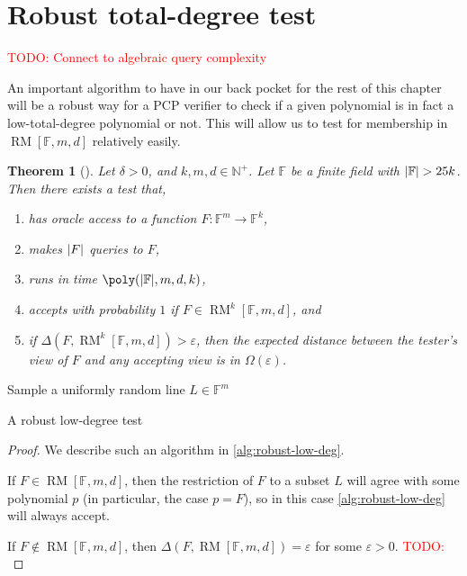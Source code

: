 \documentclass[english,12pt]{reedthesis}
\theoremstyle{plain}
\newtheorem{thm}{Theorem}[section]
\theoremstyle{definition}
\theoremstyle{remark}
\DeclareMathOperator{\RM}{RM}
\DeclarePairedDelimiter{\abs}{\lvert}{\rvert}
\newcommand{\TODO}[1]{\textcolor{red}{TODO: #1}}
\begin{document}
\section{Robust total-degree test}\label{sec:robust-degree}

\TODO{Connect to algebraic query complexity}

An important algorithm to have in our back pocket for the rest of this chapter
will be a robust way for a PCP verifier to check if a given polynomial is in
fact a low-total-degree polynomial or not. This will allow us to test for
membership in $\RM[\mathbb{F}, m, d]$ relatively easily.

\begin{thm}[{\cite[Prop.\ 5.7]{Par21}}]\label{thm:robust-low-deg}
  Let $\delta > 0$, and $k, m, d \in \mathbb{N}^{+}$. Let $\mathbb{F}$ be a finite field with
  $\abs{\mathbb{F}} > 25k$. Then there exists a test that,
  \begin{enumerate}
    \item has oracle access to a function $F\colon \mathbb{F}^{m} \rightarrow \mathbb{F}^{k}$,
    \item makes $\abs{F}$ queries to $F$,
    \item runs in time $\poly(\abs{\mathbb{F}}, m, d, k)$,
    \item accepts with probability $1$ if $F \in \RM^{k}[\mathbb{F}, m, d]$, and
    \item if $\Delta(F, \RM^{k}[\mathbb{F}, m, d]) > \varepsilon$, then the expected distance
          between the tester's view of $F$ and any accepting view is in $\Omega(\varepsilon)$.
  \end{enumerate}
\end{thm}

\begin{algorithm}[htbp]
  \KwOut{Whether $F \in \RM[\mathbb{F}, m, d]$}
  Sample a uniformly random line $L \in \mathbb{F}^{m}$\;
  \caption{A robust low-degree test~\cite[Prop.\ 5.7]{Par21}}\label{alg:robust-low-deg}
\end{algorithm}

\begin{proof}
  We describe such an algorithm in \cref{alg:robust-low-deg}.

  If $F \in \RM[\mathbb{F}, m, d]$, then the restriction of $F$ to a subset $L$
  will agree with some polynomial $p$ (in particular, the case $p = F$), so in
  this case \cref{alg:robust-low-deg} will always accept.

  If $F \notin \RM[\mathbb{F}, m, d]$, then $\Delta(F, \RM[\mathbb{F}, m, d]) = \varepsilon$ for
  some $\varepsilon > 0$. \TODO{}
\end{proof}
\end{document}
